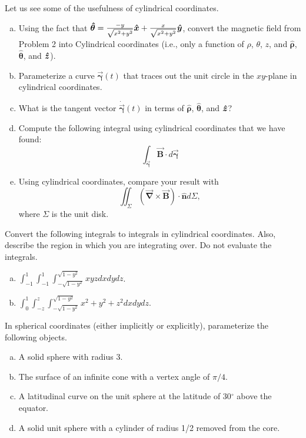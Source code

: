 \documentclass[12pt]{article} %
\newcommand{\grad}{\boldsymbol{\vec{\nabla}}}
\newcommand{\curvegamma}{\boldsymbol{\vec{\gamma}}}
\newcommand{\tangentgamma}{\boldsymbol{\dot{\vec{\gamma}}}}
\newcommand{\thetahat}{\boldsymbol{\hat{\theta}}}
\newcommand{\rhohat}{\boldsymbol{\hat{\rho}}}
\newcommand{\unitvec}{\boldsymbol{\hat{n}}}
\newcommand{\vecfieldB}{\boldsymbol{\vec{B}}}
\begin{document}
\begin{problem}
Let us see some of the usefulness of cylindrical coordinates.
\begin{enumerate}[(a)]
    \item Using the fact that $\thetahat = \frac{-y}{\sqrt{x^2+y^2}}\xhat + \frac{x}{\sqrt{x^2+y^2}}\yhat$, convert the magnetic field from Problem 2 into Cylindrical coordinates (i.e., only a function of $\rho$, $\theta$, $z$, and $\rhohat$, $\thetahat$, and $\boldsymbol{\hat{z}}$).  
        \item Parameterize a curve $\curvegamma(t)$ that traces out the unit circle in the $xy$-plane in cylindrical coordinates.
        \item What is the tangent vector $\tangentgamma(t)$ in terms of $\rhohat$, $\thetahat$, and $\boldsymbol{\hat{z}}$?
        \item Compute the following integral using cylindrical coordinates that we have found:
        \[
        \int_{\curvegamma} \vecfieldB \cdot d\curvegamma
        \]
        \item Using cylindrical coordinates, compare your result with
        \[
        \iint_\Sigma \left(\grad \times \vecfieldB\right) \cdot \unitvec d\Sigma,
        \]
        where $\Sigma$ is the unit disk.
\end{enumerate}
\end{problem}

\begin{problem}
    Convert the following integrals to integrals in cylindrical coordinates. Also, describe the region in which you are integrating over. Do not evaluate the integrals.
    \begin{enumerate}[(a)]
        \item $\displaystyle{\int_{-1}^{1} \int_{-1}^{1} \int_{-\sqrt{1-y^2}}^{\sqrt{1-y^2}} xyz dxdydz}$.
        \item $\displaystyle{\int_0^1 \int_{-z}^z \int_{-\sqrt{1-y^2}}^{\sqrt{1-y^2}} x^2+y^2+z^2 dxdydz}$.
    \end{enumerate}
\end{problem}

\begin{problem}
	In spherical coordinates (either implicitly or explicitly), parameterize the following objects.
	\begin{enumerate}[(a)]
		\item A solid sphere with radius 3.
		\item The surface of an infinite cone with a vertex angle of $\pi/4$.
		\item A latitudinal curve on the unit sphere at the latitude of 30$^\circ$ above the equator.
		\item A solid unit sphere with a cylinder of radius 1/2 removed from the core.
	\end{enumerate}
\end{problem}
 
\end{document}
